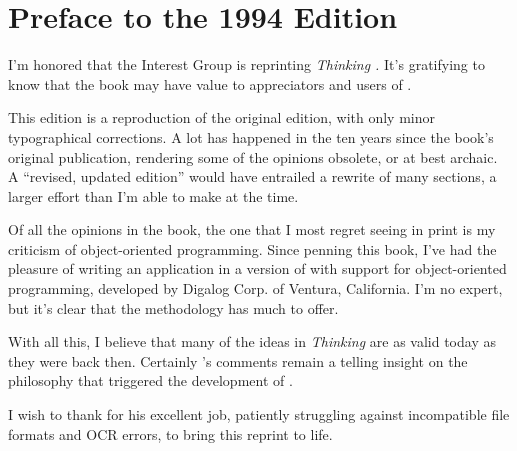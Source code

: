 \chapter*{Preface to the 1994 Edition}\label{preface94}
\pagestyle{headings}

\initial I'm honored that the \Forth{} Interest Group is reprinting
\emph{Thinking \Forth{}.} It's gratifying to know that the book may
have value to appreciators and users of \Forth{}.

This edition is a reproduction of the original edition, with only
minor typographical corrections. A lot has happened in the ten years
since the book's original publication, rendering some of the opinions
obsolete, or at best archaic. A ``revised, updated edition'' would
have entrailed a rewrite of many sections, a larger effort than I'm
able to make at the time.

Of all the opinions in the book, the one that I most regret seeing in
print is my criticism of object-oriented programming. Since penning
this book, I've had the pleasure of writing an application in a
version of \Forth{} with support for object-oriented programming,
developed by Digalog Corp. of Ventura, California. I'm no expert, but
it's clear that the methodology has much to offer.

With all this, I believe that many of the ideas in \emph{Thinking
\Forth{}} are as valid today as they were back then. Certainly 's comments remain a telling insight on the philosophy that
triggered the development of \Forth{}.

I wish to thank  for his excellent job, patiently
struggling against incompatible file formats and OCR errors, to bring
this reprint to life.
